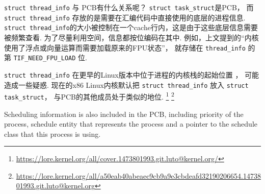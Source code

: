 
\begin{qbox}{\lstinline{struct thread_info} 与 PCB有什么关系呢？}
	\lstinline{struct task_struct}是PCB，
	而 \lstinline{struct thread_info} 存放的是需要在汇编代码中直接使用的底层的进程信息.
	\lstinline{struct thread_info}的大小被控制在一个cache行内，这是由于这些底层信息需要被频繁查看.
	为了尽量利用空间，信息都按位编码在其中.
	例如，上文提到的“内核使用了浮点或向量运算而需要加载原来的FPU状态”，
	就存储在 \lstinline{thread_info} 的第 \lstinline{TIF_NEED_FPU_LOAD} 位.

	\lstinline{struct thread_info} 在更早的Linux版本中位于进程的内核栈的起始位置
	\cite{bovet2005understanding}，
	可能造成一些疑惑.
	现在的x86 Linux内核默认把 \lstinline{struct thread_info} 放入
	\lstinline{struct task_struct}，
	与PCB的其他成员处于类似的地位.
	\footnote{\url{https://lore.kernel.org/all/cover.1473801993.git.luto@kernel.org/}}
	\footnote{\url{https://lore.kernel.org/all/a50eab40abeaec9cb9a9e3cbdeafd32190206654.1473801993.git.luto@kernel.org}}
\end{qbox}

Scheduling information is also included in the PCB, including priority of the process, schedule entity that represents the process and a pointer to the schedule class that this process is using.

